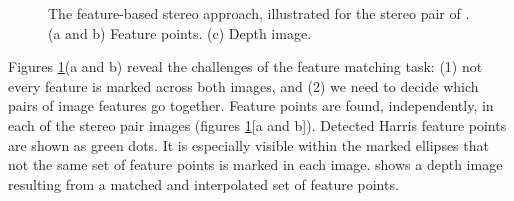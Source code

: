 \begin{figure}[h]
    \centerline{
    }
    \caption{The feature-based stereo approach, illustrated for the stereo pair of \fig{\ref{fig:stereomatch}}. (a and b) Feature points. (c) Depth image.
    }
    \label{fig:stereopoints}
\end{figure}

Figures \ref{fig:stereopoints}(a and b) reveal the challenges of the feature matching task:  (1) not every feature is marked across both images, and (2) we need to decide which pairs of image features go together.  Feature points are found, independently, in each of the stereo pair images (figures \ref{fig:stereopoints}[a and b]).  Detected Harris feature points \cite{Harris88} are shown as green dots. It is especially visible within the marked ellipses that not the same set of feature points is marked in each image.   shows a depth image resulting from a matched and interpolated set of feature points.


